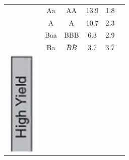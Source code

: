 \documentclass[11pt]{article}
\begin{document}
\begin{center}
\begin{tabular}{|c|c|c|c|c|c|}
{} \\
\hline
 & $\mathrm{Aa}$ & AA & 13.9 & 1.8 &  \\
\hline
 & A & A & 10.7 & 2.3 &  \\
\hline
 & Baa & BBB & 6.3 & 2.9 &  \\
\hline
 & $\mathrm{Ba}$ & $\bar{B} \bar{B}$ & 3.7 & $3 . \overline{7}$ &  \\
\hline
\multirow{5}{*}{\includegraphics[max width=\textwidth]{2024_04_10_a4f1ca289b861eaba170g-2}
}
\end{tabular}
\end{center}
\end{document}
